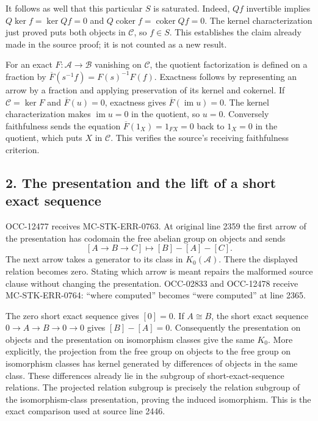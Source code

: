 \documentclass[11pt]{article}
\begin{document}
It follows as well that this particular \(S\) is saturated. Indeed, \(Qf\) invertible implies \(Q\ker f=\ker Qf=0\) and \(Q\operatorname{coker}f=\operatorname{coker}Qf=0\). The kernel characterization just proved puts both objects in \(\mathcal C\), so \(f\in S\). This establishes the claim already made in the source proof; it is not counted as a new result.

For an exact \(F:\mathcal A\to\mathcal B\) vanishing on \(\mathcal C\), the quotient factorization is defined on a fraction by \(\overline F(s^{-1}f)=F(s)^{-1}F(f)\). Exactness follows by representing an arrow by a fraction and applying preservation of its kernel and cokernel. If \(\mathcal C=\ker F\) and \(\overline F(u)=0\), exactness gives \(\overline F(\operatorname{im}u)=0\). The kernel characterization makes \(\operatorname{im}u=0\) in the quotient, so \(u=0\). Conversely faithfulness sends the equation \(\overline F(1_X)=1_{FX}=0\) back to \(1_X=0\) in the quotient, which puts \(X\) in \(\mathcal C\). This verifies the source's receiving faithfulness criterion.

\subsection{2. The presentation and the lift of a short exact sequence}\label{note-02-the-presentation-and-the-lift-of-a-short-exact-sequence}

OCC-12477 receives MC-STK-ERR-0763. At original line 2359 the first arrow of the presentation has codomain the free abelian group on objects and sends \[
[A\to B\to C]\longmapsto[B]-[A]-[C].
\] The next arrow takes a generator to its class in \(K_0(\mathcal A)\). There the displayed relation becomes zero. Stating which arrow is meant repairs the malformed source clause without changing the presentation. OCC-02833 and OCC-12478 receive MC-STK-ERR-0764: ``where computed'' becomes ``were computed'' at line 2365.

The zero short exact sequence gives \([0]=0\). If \(A\cong B\), the short exact sequence \(0\to A\to B\to0\to0\) gives \([B]-[A]=0\). Consequently the presentation on objects and the presentation on isomorphism classes give the same \(K_0\). More explicitly, the projection from the free group on objects to the free group on isomorphism classes has kernel generated by differences of objects in the same class. These differences already lie in the subgroup of short-exact-sequence relations. The projected relation subgroup is precisely the relation subgroup of the isomorphism-class presentation, proving the induced isomorphism. This is the exact comparison used at source line 2446.
\end{document}
